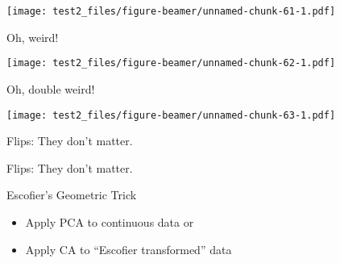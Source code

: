 \documentclass[
  ignorenonframetext,
]{beamer}
\providecommand{\tightlist}{%
  \setlength{\itemsep}{0pt}\setlength{\parskip}{0pt}}
\begin{document}
\begin{frame}

\texttt{[image: test2\_files/figure-beamer/unnamed-chunk-61-1.pdf]}

\begin{center}Oh, weird!\end{center}

\end{frame}

\begin{frame}

\texttt{[image: test2\_files/figure-beamer/unnamed-chunk-62-1.pdf]}

\begin{center}Oh, double weird!\end{center}

\end{frame}

\begin{frame}

\texttt{[image: test2\_files/figure-beamer/unnamed-chunk-63-1.pdf]}

\begin{center}Flips: They don't matter.\end{center}

\end{frame}

\begin{frame}

\begin{table}[H]
\centering
{}
\end{table}
\begin{center}Flips: They don't matter.\end{center}

\end{frame}

\begin{frame}{Escofier's Geometric Trick}
\protect\hypertarget{escofiers-geometric-trick}{}

\begin{itemize}[<+->]
\tightlist
\item
  Apply PCA to continuous data or
\item
  Apply CA to ``Escofier transformed'' data
\end{itemize}

\end{frame}
\end{document}
